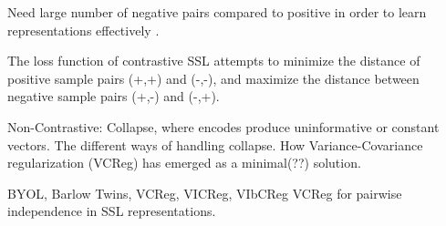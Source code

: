 \documentclass[../../thesis.tex]{subfiles}
\begin{document}
Need large number of negative pairs compared to positive in order to learn representations effectively \cite{lee2024computer}.

The loss function of contrastive SSL attempts to minimize the distance of positive sample pairs (+,+) and (-,-), and maximize the distance between negative sample pairs (+,-) and (-,+).\newline


Non-Contrastive: Collapse, where encodes produce uninformative or constant vectors. The different ways of handling collapse. How Variance-Covariance regularization (VCReg) \cite{mialon2024variance} has emerged as a minimal(??) solution. \newline
{}

BYOL, Barlow Twins, VCReg, VICReg, VIbCReg\newline
\cite{mialon2024variance} VCReg for pairwise independence in SSL representations. 









\end{document}
